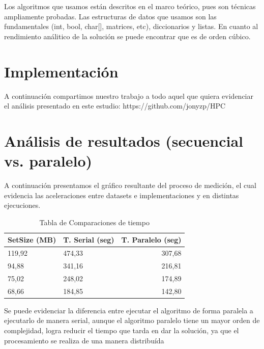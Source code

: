 \documentclass[fleqn,10pt]{SelfArx} %
\begin{document}
Los algoritmos que usamos están descritos en el marco teórico, pues son técnicas ampliamente probadas.
Las estructuras de datos que usamos son las fundamentales (int, bool, char[], matrices, etc), diccionarios y listas.
En cuanto al rendimiento análitico de la solución se puede encontrar que es de orden cúbico.


\section{Implementación}

A continuación compartimos nuestro trabajo a todo aquel que quiera evidenciar el análisis presentado en este estudio: https://github.com/jonyzp/HPC

\section{Análisis de resultados (secuencial vs. paralelo)}

A continuación presentamos el gráfico resultante del proceso de medición, el cual evidencia las aceleraciones entre datasets e implementaciones y en distintas ejecuciones.

\begin{table}[hbt]
	\caption{Tabla de Comparaciones de tiempo}
	\centering
	\begin{tabular}{llr}
		\cmidrule(r){1-3}
		SetSize (MB) & T. Serial (seg) & T. Paralelo (seg)\\
		\midrule
		
		119,92 & 474,33 & 307,68 \\
		
		94,88 & 341,16 & 216,81 \\
		
		75,02 & 248,02 & 174,89 \\
		
		68,66 & 184,85 & 142,80 \\
		
		\bottomrule
	\end{tabular}
	\label{tab:label}
\end{table}


Se puede evidenciar la diferencia entre ejecutar el algoritmo de forma paralela a ejecutarlo de manera serial, aunque el algoritmo paralelo tiene un mayor orden de complejidad, logra reducir el tiempo que tarda en dar la solución, ya que el procesamiento se realiza de una manera distribuída
\end{document}
